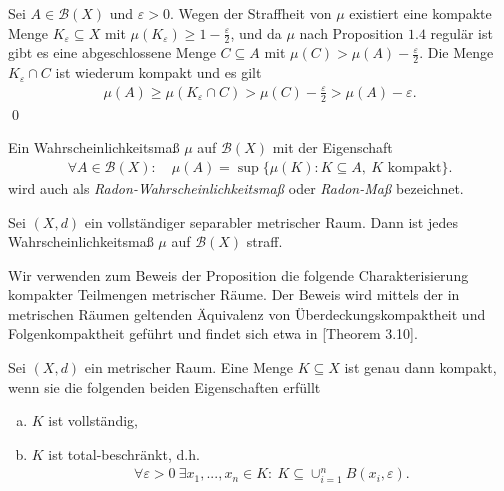 \begin{proof*}
    Sei $A \in \mathcal{B}(X)$ und $\varepsilon > 0$. Wegen der Straffheit von $\mu$ existiert eine kompakte Menge $K_{\varepsilon} \subseteq X$ mit $\mu(K_{\varepsilon}) \geq 1 - \frac{\varepsilon}{2}$,
    und da $\mu$ nach Proposition $1.4$ regulär ist gibt es eine abgeschlossene Menge $C \subseteq A$ mit $\mu(C) > \mu(A) - \frac{\varepsilon}{2}$. Die Menge $K_{\varepsilon} \cap C$ ist wiederum kompakt und es gilt
    \begin{align*}
        \mu(A) \geq \mu(K_{\varepsilon} \cap C) > \mu(C) - \frac{\varepsilon}{2} > \mu(A) - \varepsilon. 
    \end{align*} 
    \qed
\end{proof*}

\begin{remark}
    Ein Wahrscheinlichkeitsmaß $\mu$ auf $\mathcal{B}(X)$ mit der Eigenschaft
    \begin{align*}
        \forall A \in \mathcal{B}(X): \quad \mu(A) = \sup\{\mu(K): K \subseteq A, \ K \text{ kompakt}\}. 
    \end{align*}
    wird auch als \textit{Radon-Wahrscheinlichkeitsmaß} oder \textit{Radon-Maß} bezeichnet.
\end{remark}

\begin{proposition}
    Sei $(X,d)$ ein vollständiger separabler metrischer Raum. Dann ist jedes Wahrscheinlichkeitsmaß $\mu$ auf $\mathcal{B}(X)$ straff.
\end{proposition}

Wir verwenden zum Beweis der Proposition die folgende Charakterisierung kompakter Teilmengen metrischer Räume. 
Der Beweis wird mittels der in metrischen Räumen geltenden Äquivalenz von Überdeckungskompaktheit und Folgenkompaktheit  geführt und findet sich etwa in \cite{amann}[Theorem 3.10]. 

\begin{lemma}
    Sei $(X,d)$ ein metrischer Raum. Eine Menge $K \subseteq X$ ist genau dann kompakt, wenn sie die folgenden beiden Eigenschaften erfüllt
    \begin{enumerate}[(a)]
        \item $K$ ist vollständig,
        \item $K$ ist total-beschränkt, d.h.
        \begin{align*}
            \forall  \varepsilon > 0 \ \exists x_1,...,x_n \in K: \  K \subseteq \cup_{i=1}^n B(x_i, \varepsilon). 
        \end{align*} 
\end{enumerate}
\end{lemma}

